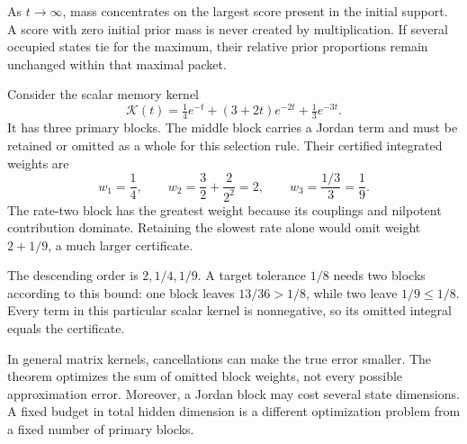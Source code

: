 As $t\to\infty$, mass concentrates on the largest score present in the initial support. A score with zero initial prior mass is never created by multiplication. If several occupied states tie for the maximum, their relative prior proportions remain unchanged within that maximal packet.

Consider the scalar memory kernel
\[
\mathcal K(t)=\tfrac14e^{-t}+(3+2t)e^{-2t}+\tfrac13e^{-3t}.
\]
It has three primary blocks. The middle block carries a Jordan term and must be retained or omitted as a whole for this selection rule. Their certified integrated weights are
\[
w_1=\frac14,\qquad w_2=\frac32+\frac{2}{2^2}=2,
\qquad w_3=\frac{1/3}{3}=\frac19.
\]
The rate-two block has the greatest weight because its couplings and nilpotent contribution dominate. Retaining the slowest rate alone would omit weight $2+1/9$, a much larger certificate.

The descending order is $2,1/4,1/9$. A target tolerance $1/8$ needs two blocks according to this bound: one block leaves $13/36>1/8$, while two leave $1/9\le1/8$. Every term in this particular scalar kernel is nonnegative, so its omitted integral equals the certificate.

In general matrix kernels, cancellations can make the true error smaller. The theorem optimizes the sum of omitted block weights, not every possible approximation error. Moreover, a Jordan block may cost several state dimensions. A fixed budget in total hidden dimension is a different optimization problem from a fixed number of primary blocks.

